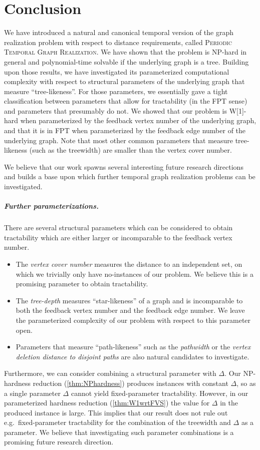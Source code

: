 \documentclass[a4paper,UKenglish,cleveref, autoref, thm-restate]{lipics-v2021}
\newcommand{\deltaExactLong}{\textsc{Periodic Temporal Graph Realization}}
\begin{document}
\section{Conclusion}\label{sec:conclusion}
We have introduced a natural and canonical temporal version of the graph realization problem with respect to distance requirements, called \deltaExactLong. 
We have shown that the problem is NP-hard in general and polynomial-time solvable if the underlying graph is a tree.
Building upon those results, we have investigated its parameterized computational complexity with respect to structural parameters of the underlying graph that measure ``tree-likeness''. For those parameters, we essentially gave a tight classification between parameters that allow for tractability (in the FPT sense) and parameters that presumably do not.
We showed that our problem is W[1]-hard when parameterized by the feedback vertex number of the underlying graph, and that it is in FPT when parameterized by the feedback edge number of the underlying graph. Note that most other common parameters that measure tree-likeness (such as the treewidth) are smaller than the vertex cover number.

We believe that our work spawns several interesting future research directions and builds a base upon which further temporal graph realization problems can be investigated.

\subparagraph{Further parameterizations.} There are several structural parameters which can be considered to obtain tractability which are either larger or incomparable to the feedback vertex number.
\begin{itemize}
    \item The \emph{vertex cover number} measures the distance to an independent set, on which we trivially only have no-instances of our problem. We believe this is a promising parameter to obtain tractability.
    \item The \emph{tree-depth} measures ``star-likeness'' of a graph and is incomparable to both the feedback vertex number and the feedback edge number. We leave the parameterized complexity of our problem with respect to this parameter open.
    \item Parameters that measure ``path-likeness'' such as the \emph{pathwidth} or the \emph{vertex deletion distance to disjoint paths} are also natural candidates to investigate.
\end{itemize}
Furthermore, we can consider combining a structural parameter with $\Delta$. Our NP-hardness reduction (\cref{thm:NPhardness}) produces instances with constant $\Delta$, so as a single parameter $\Delta$ cannot yield fixed-parameter tractability. However, in our parameterized hardness reduction (\cref{thm:W1wrtFVS}) the value for $\Delta$ in the produced instance is large. This implies that our result does not rule out e.g.\ fixed-parameter tractability for the combination of the treewidth and $\Delta$ as a parameter. We believe that investigating such parameter combinations is a promising future research direction.
\end{document}
